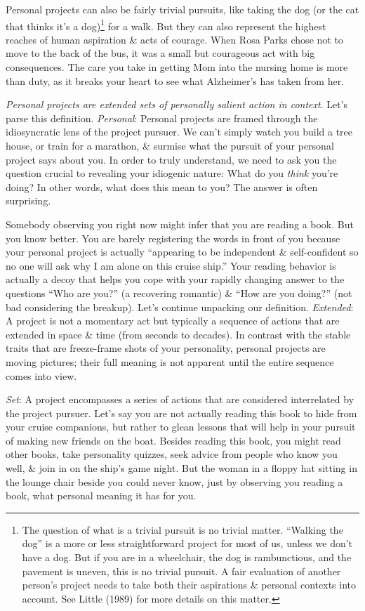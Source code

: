 \documentclass{article}
\numberwithin{equation}{section}
\begin{document}
Personal projects can also be fairly trivial pursuits, like taking the dog (or the cat that thinks it’s a dog)\footnote{The question of what is a trivial pursuit is no trivial matter. ``Walking the dog'' is a more or less straightforward project for most of us, unless we don't have a dog. But if you are in a wheelchair, the dog is rambunctious, and the pavement is uneven, this is no trivial pursuit. A fair evaluation of another person's project needs to take both their aspirations \& personal contexts into account. See Little (1989) for more details on this matter.} for a walk. But they can also represent the highest reaches of human aspiration \& acts of courage. When Rosa Parks chose not to move to the back of the bus, it was a small but courageous act with big consequences. The care you take in getting Mom into the nursing home is more than duty, as it breaks your heart to see what Alzheimer's has taken from her.

\textit{Personal projects are extended sets of personally salient action in context}. Let's parse this definition. \textit{Personal}: Personal projects are framed through the idiosyncratic lens of  the project pursuer. We can't simply watch you build a tree house, or train for a marathon, \& surmise what the pursuit of your personal project says about you. In order to truly understand, we need to ask you the question crucial to revealing your idiogenic nature: What do you \textit{think} you're doing? In other words, what does this mean to you? The answer is often surprising.

Somebody observing you right now might infer that you are reading a book. But you know better. You are barely registering the words in front of you because your personal project is actually ``appearing to be independent \& self-confident so no one will ask why I am alone on this cruise ship.'' Your reading behavior is actually a decoy that helps you cope with your rapidly changing answer to the questions ``Who are you?'' (a recovering romantic) \& ``How are you doing?'' (not bad considering the breakup). Let's continue unpacking our definition. \textit{Extended}: A project is not a momentary act but typically a sequence of actions that are extended in space \& time (from seconds to decades). In contrast with the stable traits that are freeze-frame shots of your personality, personal projects are moving pictures; their full meaning is not apparent until the entire sequence comes into view.

\textit{Set}: A project encompasses a series of actions that are considered interrelated by the project pursuer. Let's say you are not actually reading this book to hide from your cruise companions, but rather to glean lessons that will help in your pursuit of making new friends on the boat. Besides reading this book, you might read other books, take personality quizzes, seek advice from people who know you well, \& join in on the ship's game night. But the woman in a floppy hat sitting in the lounge chair beside you could never know, just by observing you reading a book, what personal meaning it has for you.
\end{document}
